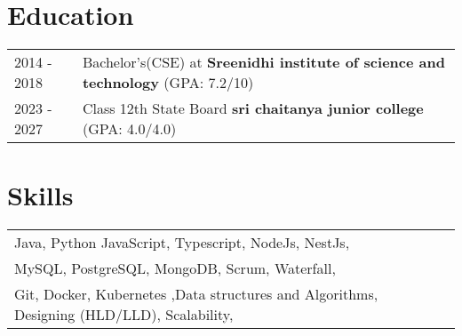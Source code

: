 \documentclass[a4paper,12pt]{article}
\begin{document}
\section{Education}
\begin{tabularx}{\linewidth}{@{}l X@{}}	
2014 - 2018 & Bachelor's(CSE) at \textbf{Sreenidhi institute of science and technology} \hfill \normalsize (GPA: 7.2/10) \\ 

2023 - 2027 &Class 12th State Board \textbf{sri chaitanya junior college} \hfill (GPA: 4.0/4.0) \\ 
\end{tabularx}



\section{Skills}
\begin{tabularx}{\linewidth}{@{}l X@{}}
Java, Python JavaScript, Typescript, NodeJs, NestJs, \\MySQL, PostgreSQL, MongoDB, Scrum, Waterfall,\\ Git, Docker, Kubernetes ,Data structures and Algorithms, Designing (HLD/LLD), Scalability, 
\end{tabularx}

\vfill
{}
\end{document}
